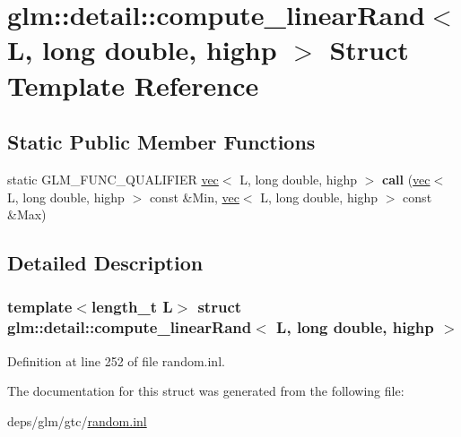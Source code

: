 \hypertarget{structglm_1_1detail_1_1compute__linearRand_3_01L_00_01long_01double_00_01highp_01_4}{}\section{glm\+:\+:detail\+:\+:compute\+\_\+linear\+Rand$<$ L, long double, highp $>$ Struct Template Reference}
\label{structglm_1_1detail_1_1compute__linearRand_3_01L_00_01long_01double_00_01highp_01_4}
\subsection*{Static Public Member Functions}
\begin{DoxyCompactItemize}
\item 
\mbox{\label{structglm_1_1detail_1_1compute__linearRand_3_01L_00_01long_01double_00_01highp_01_4_a03626251e592d7ad49e9957e32e907de}} 
static G\+L\+M\+\_\+\+F\+U\+N\+C\+\_\+\+Q\+U\+A\+L\+I\+F\+I\+ER \hyperlink{structglm_1_1vec}{vec}$<$ L, long double, highp $>$ {\bfseries call} (\hyperlink{structglm_1_1vec}{vec}$<$ L, long double, highp $>$ const \&Min, \hyperlink{structglm_1_1vec}{vec}$<$ L, long double, highp $>$ const \&Max)
\end{DoxyCompactItemize}


\subsection{Detailed Description}
\subsubsection*{template$<$length\+\_\+t L$>$\newline
struct glm\+::detail\+::compute\+\_\+linear\+Rand$<$ L, long double, highp $>$}



Definition at line 252 of file random.\+inl.



The documentation for this struct was generated from the following file\+:\begin{DoxyCompactItemize}
\item 
deps/glm/gtc/\hyperlink{random_8inl}{random.\+inl}\end{DoxyCompactItemize}
